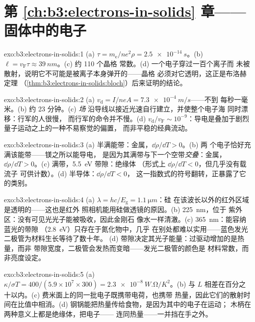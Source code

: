 \section*{第 \ref{ch:b3:electrons-in-solids} 章——固体中的电子}

\begin{solution}{exo:b3:electrons-in-solids:1}
(a) $\tau = m_{\text{e}}/ne^2\rho = \qty{2.5e-14}{s}$。(b) $\ell =
v_{\text{F}}\tau \approx \qty{39}{nm}$。(c) 约 110 个晶格
常数。(d) 一个电子穿过一百个离子而
未被散射，说明它不可能是被离子本身弹开的——晶格
必须对它透明，这正是布洛赫定理
（\cref{thm:b3:electrons-in-solids:bloch}）后来证明的结论。
\end{solution}

\begin{solution}{exo:b3:electrons-in-solids:2}
(a) $v_{\text{d}} = I/neA = \qty{7.3e-4}{m/s}$——不到
每秒一毫米。(b) 约 23 分钟。(c) \emph{场}
沿导线以接近光速自行建立，并使整个电子海
同时漂移：行军的人很慢，
而行军的命令并不慢。(d) $v_{\text{d}}/v_{\text{F}} \sim
10^{-9}$：导电是叠加于剧烈量子运动之上的一种不易察觉的偏置，
而非平稳的经典流动。
\end{solution}

\begin{solution}{exo:b3:electrons-in-solids:3}
(a) 半满能带：金属，$\dd\rho/\dd T > 0$。(b) 两
个电子恰好充满该能带——镁之所以能导电，
是因为其满带与下一个空带\emph{交叠}：金属，
$\dd\rho/\dd T > 0$。(c) 满带，\qty{5.5}{eV} 带隙：绝缘体
（形式上 $\dd\rho/\dd T < 0$，但几乎没有载流子
可供计数）。(d) 半导体：$\dd\rho/\dd T < 0$，
这一指数式的符号翻转，正暴露了它的类别。
\end{solution}

\begin{solution}{exo:b3:electrons-in-solids:4}
(a) $\lambda = hc/E_{\text{g}} = \qty{1.1}{\micro m}$：硅
在该波长以外的红外区域是透明的——这也是红外
照相机能用硅做透镜的原因。(b) \qty{225}{nm}，位于
紫外区：没有可见光光子能被吸收，因此金刚石
像水一样清澈。(c) \qty{365}{nm}：能容纳蓝光的带隙
（\qty{2.8}{eV}）只存在于氮化物中，几乎
在别处都难以实用——蓝色发光二极管为材料生长等待了数十年。
(d) 带隙决定其光子能量：过驱动增加的是热量，而非
带隙宽度，二极管会发热而变暗——发光二极管的颜色是
材料常数，而非亮度设定。
\end{solution}

\begin{solution}{exo:b3:electrons-in-solids:5}
(a) $\kappa/\sigma T = 400/(5.9\times10^7\times300) =
\qty{2.3e-8}{W.\ohm/K^2}$。(b) 与 $L$ 相差在百分之十以内。(c)
费米面上的同一批电子既携带电荷，也携带
热量，因此它们的散射时间在比值中相消。(d)
钢锅能把热量传给食物，是因为其中的电子在运动；
木柄在两种意义上都是绝缘体，把电子——
连同热量——一并挡在手之外。
\end{solution}

